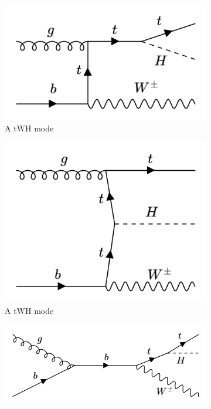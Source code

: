 \begin{figure}[htp]
  \centering
       \begin{subfigure}[b]{0.3\textwidth}
         \centering
         \includegraphics[width=\textwidth]{figures/theory_chapter/tWH1.png}
         \caption{A tWH mode}
         \label{fig:tWH1}
     \end{subfigure}
     \hfill
         \begin{subfigure}[b]{0.3\textwidth}
         \centering
         \includegraphics[width=\textwidth]{figures/theory_chapter/tWH2.png}
         \caption{A tWH mode}
         \label{fig:tWH2}
     \end{subfigure}
     \hfill
         \begin{subfigure}[b]{0.3\textwidth}
         \centering
         \includegraphics[width=\textwidth]{figures/theory_chapter/tWH3.png}

\end{subfigure}
\end{figure}
